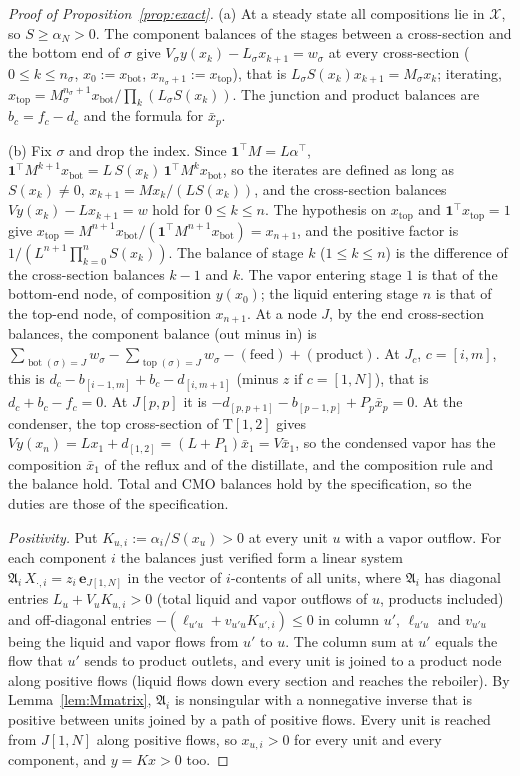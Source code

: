 \documentclass[11pt,a4paper]{report}
\newcommand{\cX}{\mathcal X}
\newcommand{\one}{\mathbf 1}
\newcommand{\bfe}{\mathbf e}
\newcommand{\Ts}{\mathrm T}
\newcommand{\xb}{x_{\mathrm{bot}}}
\newcommand{\xt}{x_{\mathrm{top}}}
\newcommand{\bott}{\operatorname{bot}}
\newcommand{\topp}{\operatorname{top}}
\begin{document}
\begin{proof}[Proof of Proposition~\ref{prop:exact}]
(a) At a steady state all compositions lie in \(\cX\), so \(S\ge\alpha_N>0\). The component balances of the stages between a
cross-section and the bottom end of \(\sigma\) give \(V_\sigma y(x_k)-L_\sigma x_{k+1}=w_\sigma\) at every cross-section (\(0\le k\le n_\sigma\),
\(x_0:=\xb\), \(x_{n_\sigma+1}:=\xt\)), that is \(L_\sigma S(x_k)x_{k+1}=M_\sigma x_k\); iterating,
\(\xt=M_\sigma^{n_\sigma+1}\xb/\prod_k(L_\sigma S(x_k))\). The junction and product balances are \(b_c=f_c-d_c\) and the formula for \(\bar x_p\).

(b) Fix \(\sigma\) and drop the index. Since \(\one^\top M=L\alpha^\top\), \(\one^\top M^{k+1}\xb=L\,S(x_k)\,\one^\top M^k\xb\), so the iterates are
defined as long as \(S(x_k)\ne0\), \(x_{k+1}=Mx_k/(LS(x_k))\), and the cross-section balances \(Vy(x_k)-Lx_{k+1}=w\) hold for
\(0\le k\le n\). The hypothesis on \(\xt\) and \(\one^\top\xt=1\) give \(\xt=M^{n+1}\xb/(\one^\top M^{n+1}\xb)=x_{n+1}\), and the positive factor
is \(1/(L^{n+1}\prod_{k=0}^nS(x_k))\). The balance of stage \(k\) (\(1\le k\le n\)) is the difference of the cross-section balances
\(k-1\) and \(k\). The vapor entering stage \(1\) is that of the bottom-end node, of composition \(y(x_0)\); the liquid entering stage \(n\)
is that of the top-end node, of composition \(x_{n+1}\). At a node \(J\), by the end cross-section balances, the component balance
(out minus in) is \(\sum_{\bott(\sigma)=J}w_\sigma-\sum_{\topp(\sigma)=J}w_\sigma-(\text{feed})+(\text{product})\). At \(J_c\), \(c=[i,m]\), this is
\(d_c-b_{[i-1,m]}+b_c-d_{[i,m+1]}\) (minus \(z\) if \(c=[1,N]\)), that is \(d_c+b_c-f_c=0\). At \(J[p,p]\) it is
\(-d_{[p,p+1]}-b_{[p-1,p]}+P_p\bar x_p=0\). At the condenser, the top cross-section of \(\Ts[1,2]\) gives
\(Vy(x_n)=Lx_1+d_{[1,2]}=(L+P_1)\bar x_1=V\bar x_1\), so the condensed vapor has the composition \(\bar x_1\) of the reflux and of the
distillate, and the composition rule and the balance hold. Total and CMO balances hold by the specification, so the duties
are those of the specification.

\emph{Positivity.} Put \(K_{u,i}:=\alpha_i/S(x_u)>0\) at every unit \(u\) with a vapor outflow. For each component \(i\) the balances just
verified form a linear system \(\mathfrak A_i\,X_{\cdot,i}=z_i\,\bfe_{J[1,N]}\) in the vector of \(i\)-contents of all units, where
\(\mathfrak A_i\) has diagonal entries \(L_u+V_uK_{u,i}>0\) (total liquid and vapor outflows of \(u\), products included) and
off-diagonal entries \(-(\ell_{u'u}+v_{u'u}K_{u',i})\le0\) in column \(u'\), \(\ell_{u'u}\) and \(v_{u'u}\) being the liquid and vapor flows
from \(u'\) to \(u\). The column sum at \(u'\) equals the flow that \(u'\) sends to product outlets, and every unit is joined to a product node
along positive flows (liquid flows down every section and reaches the reboiler). By Lemma~\ref{lem:Mmatrix}, \(\mathfrak A_i\) is
nonsingular with a nonnegative inverse that is positive between units joined by a path of positive flows. Every unit is
reached from \(J[1,N]\) along positive flows, so \(x_{u,i}>0\) for every unit and every component, and \(y=Kx>0\) too.
\end{proof}
\end{document}
